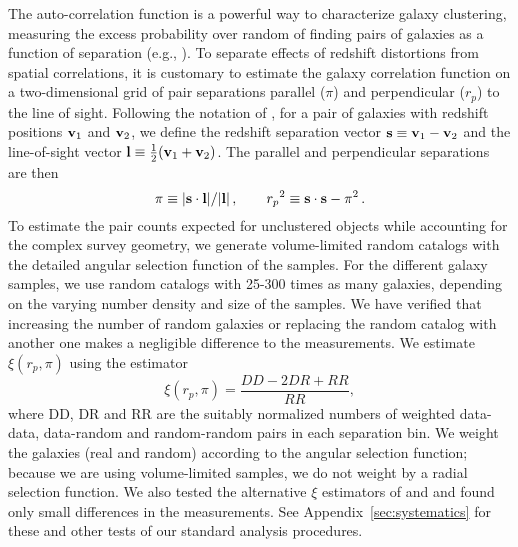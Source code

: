 \documentclass[]{emulateapj}
\begin{document}
The auto-correlation function is a powerful way to characterize galaxy
clustering,  measuring the excess probability over random of finding pairs
of galaxies as a function of separation (e.g., \citealt{peebles80}).
To separate effects of redshift distortions from spatial correlations, it
is customary to estimate the galaxy correlation function on a two-dimensional
grid of pair separations parallel ($\pi$) and perpendicular ($r_p$) to
the line of sight.  Following the notation of \citet{fisher94}, for a pair of 
galaxies with redshift positions ${\bf v}_1$
and ${\bf v}_2$, we define the redshift separation vector
${\bf s} \equiv {\bf v}_1-{\bf v}_2$ and the line-of-sight vector
${\bf l} \equiv {{1}\over{2}}({\bf v}_1+{\bf v}_2)$. 
The parallel and perpendicular separations are then
\begin{equation}
\label{eq:rppi}
\pi \equiv |{\bf s}\cdot{\bf l}|/|{\bf l}|\,, \qquad
{r_p}^2 \equiv {\bf s}\cdot{\bf s} - \pi^2\,.
\end{equation}
%
To estimate the pair counts 
expected for unclustered objects while accounting for the
complex survey geometry, we generate volume-limited random catalogs with the
detailed angular selection function of the samples. 
For the different galaxy samples, we use random catalogs with 25-300
times as many galaxies, depending on the varying number density and size of
the samples.  We have verified that 
increasing the number of random galaxies or replacing the random catalog
with another one makes a negligible difference to the measurements. 
We estimate $\xi(r_p,\pi)$ using the \citet{landy93} estimator
\begin{equation}
\label{eq:LS}
\xi(r_p,\pi)=\frac{DD-2DR+RR}{RR} ,
\end{equation}
where DD, DR and RR are the suitably normalized numbers of weighted
data-data, data-random and random-random pairs in each separation
bin. We weight the galaxies (real and random) according to the angular
selection function; because we are using volume-limited samples, we do not
weight by a radial selection function.
We also tested the alternative $\xi$ estimators of \citet{hamilton93} and 
\citet{davis83} and found only small differences in the measurements. See
Appendix~\ref{sec:systematics} for these and other tests of our
standard analysis procedures.
\end{document}
